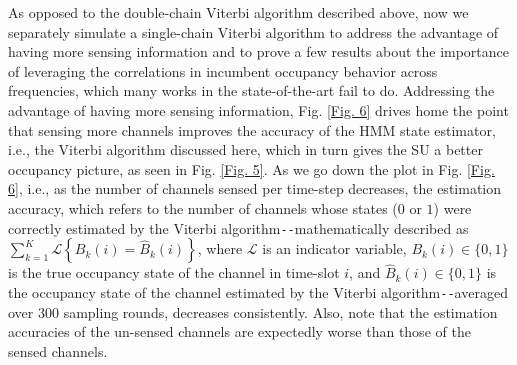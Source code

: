 \documentclass[12pt, draftcls, onecolumn]{IEEEtran}
\begin{document}
As opposed to the double-chain Viterbi algorithm described above, now we separately simulate a single-chain Viterbi algorithm to address the advantage of having more sensing information and to prove a few results about the importance of leveraging the correlations in incumbent occupancy behavior across frequencies, which many works in the state-of-the-art fail to do. Addressing the advantage of having more sensing information, Fig. \ref{Fig. 6} drives home the point that sensing more channels improves the accuracy of the HMM state estimator, i.e., the Viterbi algorithm discussed here, which in turn gives the SU a better occupancy picture, as seen in Fig. \ref{Fig. 5}. As we go down the plot in Fig. \ref{Fig. 6}, i.e., as the number of channels sensed per time-step decreases, the estimation accuracy, which refers to the number of channels whose states ($0$ or $1$) were correctly estimated by the Viterbi algorithm\texttt{-{}-}mathematically described as $\sum_{k{=}1}^{K}\mathcal{L}\left\{B_{k}(i){=}\hat{B}_{k}(i)\right\}$, where $\mathcal{L}$ is an indicator variable, $B_{k}(i){\in}\{0,1\}$ is the true occupancy state of the channel in time-slot $i$, and $\hat{B}_{k}(i){\in}\{0,1\}$ is the occupancy state of the channel estimated by the Viterbi algorithm\texttt{-{}-}averaged over $300$ sampling rounds, decreases consistently. Also, note that the estimation accuracies of the un-sensed channels are expectedly worse than those of the sensed channels.
\end{document}
